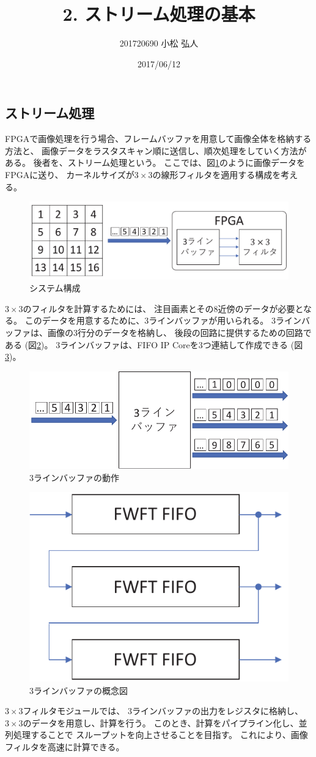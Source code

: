 \documentclass[11pt]{jsarticle}
\title{2. ストリーム処理の基本}
\author{201720690 小松 弘人}
\date{2017/06/12}
\begin{document}
\maketitle
\subsection*{ストリーム処理}
FPGAで画像処理を行う場合、フレームバッファを用意して画像全体を格納する方法と、
画像データをラスタスキャン順に送信し、順次処理をしていく方法がある。
後者を、ストリーム処理という。
ここでは、図\ref{img:raster}のように画像データをFPGAに送り、
カーネルサイズが$3\!\times\!3$の線形フィルタを適用する構成を考える。

\begin{figure}[ht]
	\centering
	\includegraphics[width=0.7\linewidth]{../img/raster.pdf}
	\caption{システム構成}
	\label{img:raster}
\end{figure}

\vspace{-0.5cm}

$3\!\times\!3$のフィルタを計算するためには、
注目画素とその8近傍のデータが必要となる。
このデータを用意するために、3ラインバッファが用いられる。
3ラインバッファは、画像の3行分のデータを格納し、
後段の回路に提供するための回路である (図\ref{img:3linebuf})。
3ラインバッファは、FIFO IP Coreを3つ連結して作成できる (図\ref{img:3lb_fifo})。

\begin{figure}[ht]
	\centering
	\includegraphics[width=0.5\linewidth]{../img/3lb.pdf}
	\caption{3ラインバッファの動作}
	\label{img:3linebuf}
\end{figure}

\vspace{-0.5cm}

\begin{figure}[ht]
	\centering
	\includegraphics[width=0.3\linewidth]{../img/3lb_fifo.pdf}
	\caption{3ラインバッファの概念図}
	\label{img:3lb_fifo}
\end{figure}

$3\!\times\!3$フィルタモジュールでは、
3ラインバッファの出力をレジスタに格納し、
$3\!\times\!3$のデータを用意し、計算を行う。
このとき、計算をパイプライン化し、並列処理することで
スループットを向上させることを目指す。
これにより、画像フィルタを高速に計算できる。
\end{document}
